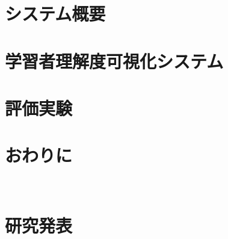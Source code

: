 %
%
\chapter{システム概要}
\label{chap:content}


%
%
\chapter{学習者理解度可視化システム}
\label{chap:system}


%
%
\chapter{評価実験}
\label{chap:experiment}


%
%
\chapter{おわりに}
\label{chap:conclusion}


%
%


%
%
\acknowledgement　%


%
%
\chapter*{研究発表}


%
% 

